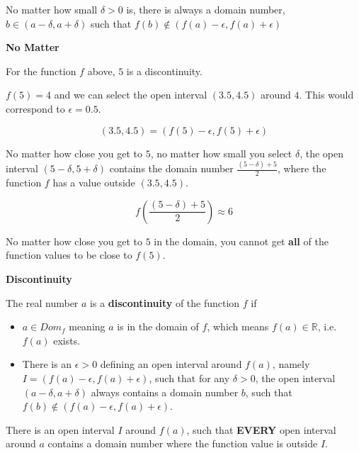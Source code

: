 \documentclass{ximera}
\begin{document}
No matter how small $\delta>0$ is, there is always a domain number, $b \in (a-\delta, a+\delta)$ such that $ f(b) \not\in(f(a)-\epsilon, f(a)+\epsilon)$ 





\begin{observation} \textbf{\textcolor{-red!75}{No Matter}}

For the function $f$ above, $5$ is a discontinuity. 


$f(5) = 4$ and we can select the open interval $(3.5, 4.5)$ around $4$.   This would correspond to $\epsilon = 0.5$.

\[   (3.5, 4.5) = (f(5) - \epsilon, f(5) + \epsilon)    \]


No matter how close you get to $5$, no matter how small you select $\delta$, the open interval $(5 - \delta, 5 + \delta)$ contains the domain number $\frac{(5 - \delta) + 5}{2}$, where the function $f$ has a value outside $(3.5, 4.5)$.


\[
f\left( \frac{(5 - \delta) + 5}{2} \right) \approx 6
\]

No matter how close you get to $5$ in the domain, you cannot get \textbf{\textcolor{blue!55!black}{all}} of the function values to be close to $f(5)$.

\end{observation}



















\begin{idea} \textbf{\textcolor{blue!55!black}{Discontinuity}}

The real number $a$ is a \textbf{discontinuity} of the function $f$ if

\begin{itemize}
\item $a \in Dom_f$ meaning $a$ is in the domain of $f$, which means $f(a) \in \mathbb{R}$, i.e. $f(a)$ exists.
\item There is an $\epsilon > 0$ defining an open interval around $f(a)$, namely $I = (f(a) - \epsilon, f(a) + \epsilon)$, such that for any $\delta > 0$, the open interval $(a - \delta, a + \delta)$ always contains a domain number $b$, such that $f(b) \not\in(f(a)-\epsilon, f(a)+\epsilon)$.
\end{itemize}

There is an open interval $I$ around $f(a)$, such that \textbf{\textcolor{purple!85!blue}{EVERY}} open interval around $a$ contains a domain number where the function value is outside $I$.

\end{idea}
\end{document}
